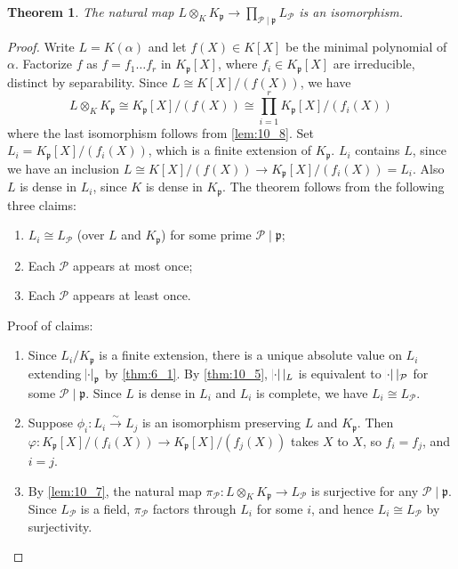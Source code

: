 \documentclass[11pt]{article}
\theoremstyle{definition}
\theoremstyle{plain}
\newtheorem{theorem}[definition]{Theorem}
\theoremstyle{remark}
\newcommand{\cP}{\mathcal{P}}
\newcommand{\fp}{\mathfrak{p}}
\begin{document}
\begin{theorem}\label{thm:10_9}
    The natural map $L \otimes_K K_\fp \to \prod_{\cP \mid \fp} L_\cP$ is an isomorphism.
\end{theorem}
\begin{proof}
    Write $L = K(\alpha)$ and let $f(X) \in K[X]$ be the minimal polynomial of $\alpha$. Factorize $f$ as $f = f_1 \ldots f_r$ in $K_\fp[X]$, where $f_i \in K_\fp[X]$ are irreducible, distinct by separability. Since $L \cong K[X] / (f(X))$, we have
    \begin{equation*}
        L \otimes_K K_\fp \cong K_\fp[X]/(f(X)) \cong \prod_{i=1}^r K_\fp[X]/(f_i(X))
    \end{equation*}
    where the last isomorphism follows from \autoref{lem:10_8}. Set $L_i = K_\fp[X] / (f_i(X))$, which is a finite extension of $K_\fp$. $L_i$ contains $L$, since we have an inclusion $L \cong K[X] / (f(X)) \to K_\fp[X] / (f_i(X)) = L_i$. Also $L$ is dense in $L_i$, since $K$ is dense in $K_\fp$. The theorem follows from the following three claims:
    \begin{enumerate}
        \item $L_i \cong L_\cP$ (over $L$ and $K_\fp$) for some prime $\cP \mid \fp$;
        \item Each $\cP$ appears at most once;
        \item Each $\cP$ appears at least once.
    \end{enumerate}
    Proof of claims:
    \begin{enumerate}
        \item Since $L_i/K_\fp$ is a finite extension, there is a unique absolute value on $L_i$ extending $\abs{\cdot}_\fp$ by \autoref{thm:6_1}. By \autoref{thm:10_5}, $\abs{\cdot} \vert_L$ is equivalent to $\abs{\cdot} \vert_\cP$ for some $\cP \mid \fp$. Since $L$ is dense in $L_i$ and $L_i$ is complete, we have $L_i \cong L_\cP$.
        \item Suppose $\phi_i : L_i \xrightarrow{\sim} L_j$ is an isomorphism preserving $L$ and $K_\fp$. Then $\varphi : K_\fp[X] / (f_i(X)) \to K_\fp[X] / (f_j(X))$ takes $X$ to $X$, so $f_i = f_j$, and $i = j$.
        \item By \autoref{lem:10_7}, the natural map $\pi_\cP : L \otimes_K K_\fp \to L_\cP$ is surjective for any $\cP \mid \fp$. Since $L_\cP$ is a field, $\pi_\cP$ factors through $L_i$ for some $i$, and hence $L_i \cong L_\cP$ by surjectivity. \qedhere
    \end{enumerate}
\end{proof}
\end{document}
